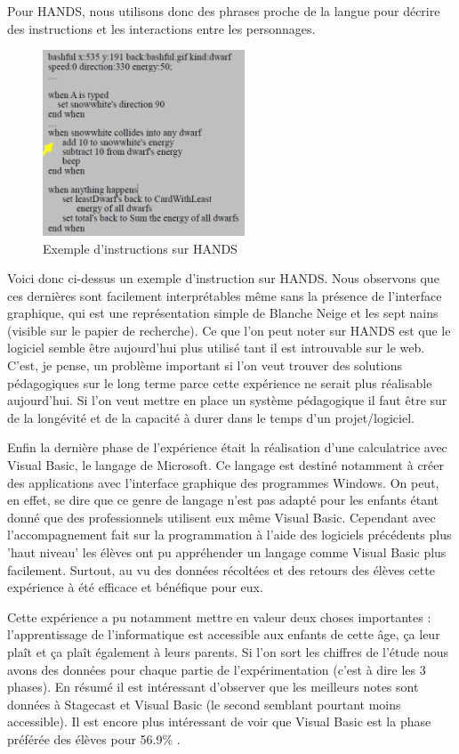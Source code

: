 Pour HANDS, nous utilisons donc des phrases proche de la langue pour décrire des instructions et les interactions entre les personnages.

\begin{figure}[!htb]
  \centering
  \includegraphics[width=60mm,scale=0.5]{images/hands.png}
  \caption{Exemple d'instructions sur HANDS}
  \label{fig:boat1}
\end{figure}

Voici donc ci-dessus un exemple d'instruction sur HANDS. Nous observons que ces dernières sont facilement interprétables même sans la présence de l'interface graphique, qui est une représentation simple de Blanche Neige et les sept nains (visible sur le papier de recherche). Ce que l'on peut noter sur HANDS est que le logiciel semble être aujourd'hui plus utilisé tant il est introuvable sur le web. C'est, je pense, un problème important si l'on veut trouver des solutions pédagogiques sur le long terme parce cette expérience ne serait plus réalisable aujourd'hui. Si l'on veut mettre en place un système pédagogique il faut être sur de la longévité et de la capacité à durer dans le temps d'un projet/logiciel.

Enfin la dernière phase de l'expérience était la réalisation d'une calculatrice avec Visual Basic, le langage de Microsoft. Ce langage est destiné notamment à créer des applications avec l'interface graphique des programmes Windows. On peut, en effet, se dire que ce genre de langage n'est pas adapté pour les enfants étant donné que des professionnels utilisent eux même Visual Basic. Cependant avec l'accompagnement fait sur la programmation à l'aide des logiciels précédents plus 'haut niveau' les élèves ont pu appréhender un langage comme Visual Basic plus facilement. Surtout, au vu des données récoltées et des retours des élèves cette expérience à été efficace et bénéfique pour eux.

Cette expérience a pu notamment mettre en valeur deux choses importantes : l'apprentissage de l'informatique est accessible aux enfants de cette âge, ça leur plaît et ça plaît également à leurs parents. Si l'on sort les chiffres de l'étude nous avons des données pour chaque partie de l'expérimentation (c'est à dire les 3 phases). En résumé il est intéressant d'observer que les meilleurs notes sont données à Stagecast et Visual Basic (le second semblant pourtant moins accessible). Il est encore plus intéressant de voir que Visual Basic est la phase préférée des élèves pour 56.9\% .

